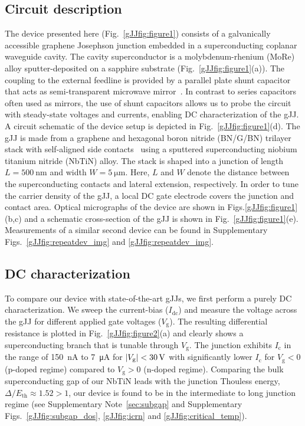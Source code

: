 \subsection{Circuit description}

The device presented here (Fig.~\ref{gJJfig:figure1}) consists of a galvanically accessible graphene Josephson junction embedded in a superconducting coplanar waveguide cavity.
The cavity superconductor is a molybdenum-rhenium (MoRe) alloy sputter-deposited on a sapphire substrate (Fig.~\ref{gJJfig:figure1}(a)).
The coupling to the external feedline is provided by a parallel plate shunt capacitor that acts as semi-transparent microwave mirror~\cite{bosmanBroadbandArchitectureGalvanically2015c,singhMolybdenumrheniumAlloyBased2014}.
In contrast to series capacitors often used as mirrors, the use of shunt capacitors allows us to probe the circuit with steady-state voltages and currents, enabling DC characterization of the gJJ.
A circuit schematic of the device setup is depicted in Fig.~\ref{gJJfig:figure1}(d).
The gJJ is made from a graphene and hexagonal boron nitride (BN/G/BN) trilayer stack with self-aligned side contacts~\cite{pizzoccheroHotPickupTechnique2016a,wangOneDimensionalElectricalContact2013b} using a sputtered superconducting niobium titanium nitride (NbTiN) alloy.
The stack is shaped into a junction of length $L=\SI{500}{\nano\meter}$ and width $W=\SI{5}{\micro\meter}$.
Here, $L$ and $W$ denote the distance between the superconducting contacts and lateral extension, respectively.
In order to tune the carrier density of the gJJ, a local DC gate electrode covers the junction and contact area.
Optical micrographs of the device are shown in Figs.\ref{gJJfig:figure1}(b,c) and a schematic cross-section of the gJJ is shown in Fig.~\ref{gJJfig:figure1}(e).
Measurements of a similar second device can be found in Supplementary Figs.~\ref{gJJfig:repeatdev_img} and \ref{gJJfig:repeatdev_img}.

\subsection{DC characterization}

To compare our device with state-of-the-art gJJs, we first perform a purely DC characterization.
We sweep the current-bias ($I_\text{dc}$) and measure the voltage across the gJJ for different applied gate voltages ($V_\text{g}$).
The resulting differential resistance is plotted in Fig.~\ref{gJJfig:figure2}(a) and clearly shows a superconducting branch that is tunable through $V_\text{g}$.
The junction exhibits $I_\text{c}$ in the range of \SI{150}{\nano\ampere} to \SI{7}{\micro\ampere} for $\lvert V_\text{g}\rvert<\SI{30}{\volt}$ with significantly lower $I_\text{c}$ for $V_\text{g}<0$ (p-doped regime) compared to $V_\text{g}>0$ (n-doped regime).
Comparing the bulk superconducting gap of our NbTiN leads with the junction Thouless energy, $\Delta/E_\text{th}\approx1.52>1$, our device is found to be in the intermediate to long junction regime (see Supplementary Note~\ref{sec:subgap} and Supplementary Figs.~\ref{gJJfig:subgap_dos}, \ref{gJJfig:icrn} and \ref{gJJfig:critical_temp}).

